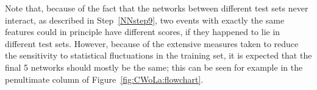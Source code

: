 
Note that, because of the fact that the networks between different test sets never interact, as described in Step~\ref{NNstep9}, two events with exactly the same features could in principle have different scores, if they happened to lie in different test sets.
However, because of the extensive measures taken to reduce the sensitivity to statistical fluctuations in the training set, it is expected that the final 5 networks should mostly be the same; this can be seen for example in the penultimate column of Figure~\ref{fig:CWoLa:flowchart}.

